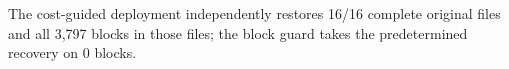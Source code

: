 The cost-guided deployment independently restores 16/16 complete original files and all 3,797 blocks in those files; the block guard takes the predetermined recovery on 0 blocks.
